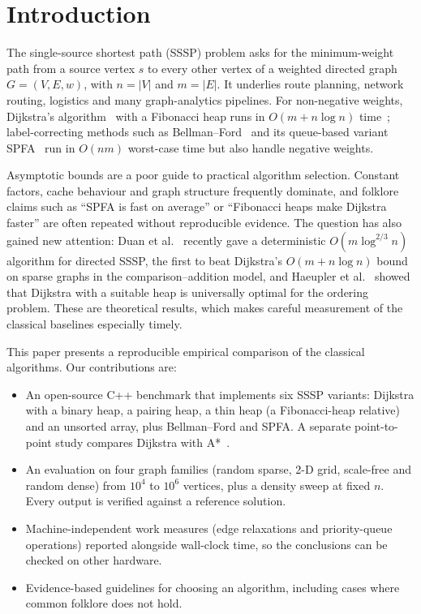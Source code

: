 \documentclass[conference]{IEEEtran}
\begin{document}
\section{Introduction}

The single-source shortest path (SSSP) problem asks for the minimum-weight
path from a source vertex $s$ to every other vertex of a weighted directed graph
$G=(V,E,w)$, with $n=|V|$ and $m=|E|$. It underlies route planning, network
routing, logistics and many graph-analytics pipelines. For non-negative weights,
Dijkstra's algorithm~\cite{dijkstra1959} with a Fibonacci heap runs in
$O(m + n\log n)$ time~\cite{fredman1987}; label-correcting methods such as
Bellman--Ford~\cite{bellman1958,ford1956,moore1959} and its queue-based variant
SPFA~\cite{duan1994spfa} run in $O(nm)$ worst-case time but also handle negative
weights.

Asymptotic bounds are a poor guide to practical algorithm selection. Constant
factors, cache behaviour and graph structure frequently dominate, and folklore
claims such as ``SPFA is fast on average'' or ``Fibonacci heaps make Dijkstra
faster'' are often repeated without reproducible evidence. The question has also
gained new attention: Duan et al.~\cite{duan2025} recently gave a deterministic
$O(m\log^{2/3} n)$ algorithm for directed SSSP, the first to beat Dijkstra's
$O(m + n\log n)$ bound on sparse graphs in the comparison--addition model, and
Haeupler et al.~\cite{haeupler2024} showed that Dijkstra with a suitable heap is
universally optimal for the ordering problem. These are theoretical results,
which makes careful measurement of the classical baselines especially timely.

This paper presents a reproducible empirical comparison of the classical
algorithms. Our contributions are:
\begin{itemize}
  \item An open-source C++ benchmark that implements six SSSP variants:
        Dijkstra with a binary heap, a pairing heap, a thin heap (a Fibonacci-heap
        relative) and an unsorted array, plus Bellman--Ford and SPFA. A separate
        point-to-point study compares Dijkstra with A*~\cite{hart1968}.
  \item An evaluation on four graph families (random sparse, 2-D grid,
        scale-free and random dense) from $10^4$ to $10^6$ vertices, plus a
        density sweep at fixed $n$. Every output is verified against a
        reference solution.
  \item Machine-independent work measures (edge relaxations and priority-queue
        operations) reported alongside wall-clock time, so the conclusions can
        be checked on other hardware.
  \item Evidence-based guidelines for choosing an algorithm, including cases
        where common folklore does not hold.
\end{itemize}
\end{document}
